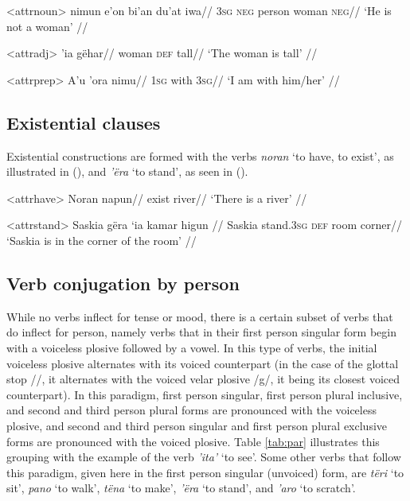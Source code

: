 \documentclass[12pt]{article}
\begin{document}
\ex<attrnoun>
\begingl %
\gla nimun e'on bi'an du'at iwa//
\glb \textsc{3sg} \textsc{neg} person woman \textsc{neg}//
\glft `He is not a woman' // 
\endgl
\xe 

\ex<attradj>
\begingl %
 'ia gëhar//
\glb woman \textsc{def} tall//
\glft `The woman is tall' // 
\endgl
\xe 

\ex<attrprep>
\begingl %
\gla A'u 'ora nimu//
\glb \textsc{1sg} with \textsc{3sg}//
\glft `I am with him/her' // 
\endgl
\xe 

\subsection{Existential clauses}
Existential constructions are formed with the verbs \textit{noran} `to have, to exist', as illustrated in (), and \textit{'ëra} `to stand', as seen in ().

\ex<attrhave>
\begingl %
\gla Noran napun//
\glb exist river//
\glft `There is a river' // 
\endgl
\xe 

\ex<attrstand>
\begingl %
\gla Saskia gëra ‘ia kamar higun //
\glb Saskia stand.\textsc{3sg} \textsc{def} room corner//
\glft `Saskia is in the corner of the room' // 
\endgl
\xe 

\subsection{Verb conjugation by person}\label{sec:conj}

While no verbs inflect for tense or mood, there is a certain subset of verbs that do inflect for person, namely verbs that in their first person singular form begin with a voiceless plosive followed by a vowel. In this type of verbs, the initial voiceless plosive alternates with its voiced counterpart (in the case of the glottal stop /\textglotstop/, it alternates with the voiced velar plosive /g/, it being its closest voiced counterpart). In this paradigm, first person singular, first person plural inclusive, and second and third person plural forms are pronounced with the voiceless plosive, and second and third person singular and first person plural exclusive forms are pronounced with the voiced plosive. Table \ref{tab:par} illustrates this grouping with the example of the verb \textit{'ita'} `to see'. Some other verbs that follow this paradigm, given here in the first person singular (unvoiced) form, are \textit{tëri} `to sit', \textit{pano} `to walk', \textit{tëna} `to make', \textit{'ëra} `to stand', and \textit{'aro} `to scratch'.
\end{document}
